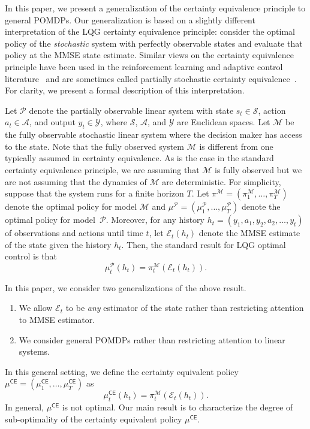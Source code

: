 \documentclass[letterpaper, 10pt]{IEEEtran}
\theoremstyle{plain}
\theoremstyle{nonumberplain}
\theoremstyle{plain}
\newcommand*\ALPHABET{\mathcal}
\newcommand\EST{\mathcal{E}}
\newcommand*\CE{\mathsf{CE}}
\begin{document}
In this paper, we present a generalization of the certainty equivalence principle to general POMDPs. Our generalization is based on a slightly different interpretation of the LQG certainty equivalence principle: consider the optimal policy of the \emph{stochastic} system with perfectly observable states and evaluate that policy at the MMSE state estimate. Similar views on the certainty equivalence principle have been used in the reinforcement learning and adaptive control literature~\cite{hardtrecht2022patterns} and are sometimes called partially stochastic certainty equivalence~\cite{bertsekas2012dynamic}. For clarity, we present a formal description of this interpretation.

Let $\ALPHABET P$ denote the partially observable linear system with state $s_t \in \ALPHABET S$, action $a_t \in \ALPHABET A$, and output $y_t \in \ALPHABET Y$, where $\ALPHABET S$, $\ALPHABET A$, and $\ALPHABET Y$ are Euclidean spaces. Let $\ALPHABET M$ be the fully observable stochastic linear system where the decision maker has access to the state. Note that the fully observed system $\ALPHABET M$ is different from one typically assumed in certainty equivalence. As is the case in the standard certainty equivalence principle, we are assuming that $\ALPHABET M$ is fully observed but we are not assuming that the dynamics of $\ALPHABET M$ are deterministic. For simplicity, suppose that the system runs for a finite horizon $T$. Let $\pi^{\ALPHABET M} = (\pi^{\ALPHABET M}_1, \dots, \pi^{\ALPHABET M}_T)$ denote the optimal policy for model $\ALPHABET M$ and $\mu^{\ALPHABET P} = (\mu^{\ALPHABET P}_1, \dots, \mu^{\ALPHABET P}_T)$ denote the optimal policy for model~$\ALPHABET P$. Moreover, for any history $h_t = (y_1, a_1, y_2, a_2, \dots, y_{t})$ of observations and actions until time $t$, let $\EST_t(h_t)$ denote the MMSE estimate of the state given the history $h_t$. Then, the standard result for LQG optimal control is that
\[
    \mu^{\ALPHABET P}_t(h_t) = \pi^{\ALPHABET M}_t(\EST_t(h_t)).
\]


In this paper, we consider two generalizations of the above result.
\begin{enumerate}
    \item We allow $\EST_t$ to be \emph{any} estimator of the state rather than restricting attention to MMSE estimator.
    \item We consider general POMDPs rather than restricting attention to linear systems.
\end{enumerate}
In this general setting, we define the certainty equivalent policy $\mu^{\CE} = (\mu^{\CE}_1, \dots, \mu^{\CE}_T)$ as
\begin{equation}\label{eq:CE}
    \mu^{\CE}_t(h_t) = \pi^{\ALPHABET M}_t(\EST_t(h_t)).
\end{equation}
In general, $\mu^{\CE}$ is not optimal. Our main result is to characterize the degree of sub-optimality of the certainty equivalent policy $\mu^{\CE}$.
\end{document}
